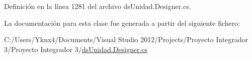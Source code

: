 Definición en la línea 1281 del archivo ds\-Unidad.\-Designer.\-cs.



La documentación para esta clase fue generada a partir del siguiente fichero\-:\begin{DoxyCompactItemize}
\item 
C\-:/\-Users/\-Yknx4/\-Documents/\-Visual Studio 2012/\-Projects/\-Proyecto Integrador 3/\-Proyecto Integrador 3/\hyperlink{ds_unidad_8_designer_8cs}{ds\-Unidad.\-Designer.\-cs}\end{DoxyCompactItemize}
